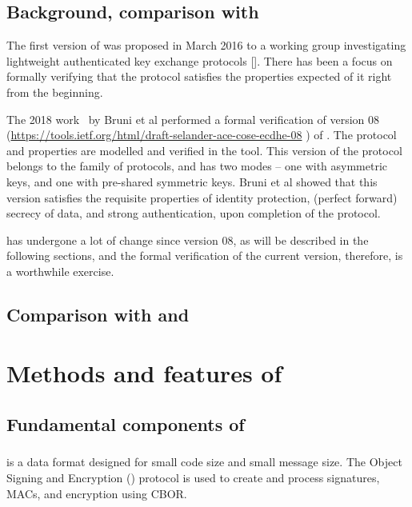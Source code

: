 \subsection{Background, comparison with~\cite{DBLP:conf/secsr/BruniJPS18}}
The first version of \mEdhoc was proposed in March 2016 to a working group investigating lightweight authenticated key exchange protocols [\mcneed]. There has been a focus on formally verifying that the protocol satisfies the properties expected of it right from the beginning. 

The 2018 work~\cite{DBLP:conf/secsr/BruniJPS18} by Bruni et al performed a formal verification of version 08 (\url{https://tools.ietf.org/html/draft-selander-ace-cose-ecdhe-08} \mcfix) of \mEdhoc. The protocol and properties are modelled and verified in the \mProverif tool. This version of the protocol belongs to the \mSigmaI family of protocols, and has two modes -- one with asymmetric keys, and one with pre-shared symmetric keys. Bruni et al showed that this version satisfies the requisite properties of identity protection, (perfect forward) secrecy of data, and strong authentication, upon completion of the protocol.

\mEdhoc has undergone a lot of change since version 08, as will be described in the following sections, and the formal verification of the current version, therefore, is a worthwhile exercise.

\subsection{Comparison with \mOptls and \mNoise}


\section{Methods and features of \mEdhoc}\label{sec:methods}

\subsection{Fundamental components of \mEdhoc}
\subsubsection{\mCose}
\mCbor is a data format designed for small code size and small message size. The \mCbor Object Signing and Encryption (\mCose) protocol is used to create and process signatures, MACs, and encryption using CBOR. 

